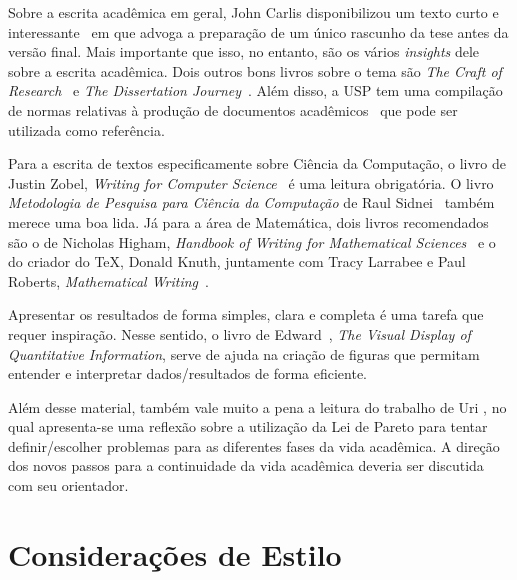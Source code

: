 Sobre a escrita acadêmica em geral, John Carlis disponibilizou um texto curto
e interessante~\citep{carlis:09} em que advoga a preparação de um único
rascunho da tese antes da versão final. Mais importante que isso, no
entanto, são os vários \textit{insights} dele sobre a escrita acadêmica.
Dois outros bons livros sobre o tema são \emph{The Craft of Research}~\citep{craftresearch}
e \emph{The Dissertation Journey}~\citep{dissertjourney}. Além disso, a USP
tem uma compilação de normas relativas à produção de documentos
acadêmicos~\citep{usp:guidelines} que pode ser utilizada como referência.

Para a escrita de textos especificamente sobre Ciência da Computação, o
livro de Justin Zobel, \emph{Writing for Computer Science}~\citep{zobel:04}
é uma leitura obrigatória. O livro \emph{Metodologia de Pesquisa para
Ciência da Computação} de
Raul Sidnei~\citet{waz:09} %
também merece uma boa lida. Já para a área de Matemática, dois livros
recomendados são o de Nicholas Higham, \emph{Handbook of Writing for
Mathematical Sciences}~\citep{Higham:98} e o do criador do \TeX{}, Donald
Knuth, juntamente com Tracy Larrabee e Paul Roberts, \emph{Mathematical
Writing}~\citep{Knuth:96}.

Apresentar os resultados de forma simples, clara e completa é uma tarefa que
requer inspiração. Nesse sentido, o livro de
Edward~\citet{tufte01:visualDisplay}, %
\emph{The Visual Display of Quantitative Information}, serve de ajuda na
criação de figuras que permitam entender e interpretar dados/resultados de forma
eficiente.

Além desse material, também vale muito a pena a leitura do trabalho de
Uri \citet{alon09:how}, %
no qual apresenta-se uma reflexão sobre a utilização da Lei de Pareto para
tentar definir/escolher problemas para as diferentes fases da vida acadêmica.
A direção dos novos passos para a continuidade da vida acadêmica deveria ser
discutida com seu orientador.

\section{Considerações de Estilo}
\label{sec:consideracoes_preliminares}

